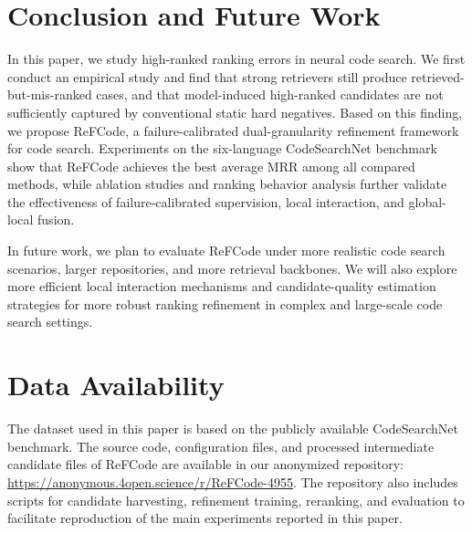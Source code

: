 \documentclass[10pt,conference]{IEEEtran}
\newcommand{\method}{ReFCode}
\begin{document}
\section{Conclusion and Future Work}

In this paper, we study high-ranked ranking errors in neural code search. 
We first conduct an empirical study and find that strong retrievers still produce retrieved-but-mis-ranked cases, and that model-induced high-ranked candidates are not sufficiently captured by conventional static hard negatives. 
Based on this finding, we propose \method{}, a failure-calibrated dual-granularity refinement framework for code search. 
Experiments on the six-language CodeSearchNet benchmark show that \method{} achieves the best average MRR among all compared methods, while ablation studies and ranking behavior analysis further validate the effectiveness of failure-calibrated supervision, local interaction, and global-local fusion.

In future work, we plan to evaluate ReFCode under more realistic code search scenarios, larger repositories, and more retrieval backbones. 
We will also explore more efficient local interaction mechanisms and candidate-quality estimation strategies for more robust ranking refinement in complex and large-scale code search settings.

\section{Data Availability}

The dataset used in this paper is based on the publicly available CodeSearchNet benchmark. 
The source code, configuration files, and processed intermediate candidate files of ReFCode are available in our anonymized repository: \url{https://anonymous.4open.science/r/ReFCode-4955}. 
The repository also includes scripts for candidate harvesting, refinement training, reranking, and evaluation to facilitate reproduction of the main experiments reported in this paper.

\clearpage



\end{document}
